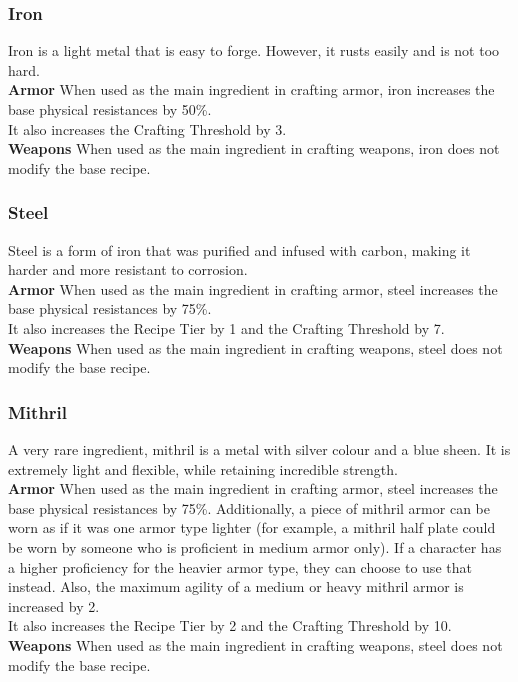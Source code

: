 \subsubsection{Iron}
Iron is a light metal that is easy to forge.
However, it rusts easily and is not too hard.\\
\textbf{Armor}
When used as the main ingredient in crafting armor, iron increases the base physical resistances by 50\%.\\
It also increases the Crafting Threshold by 3.\\
\textbf{Weapons}
When used as the main ingredient in crafting weapons, iron does not modify the base recipe.

\subsubsection{Steel}
Steel is a form of iron that was purified and infused with carbon, making it harder and more resistant to corrosion.\\
\textbf{Armor}
When used as the main ingredient in crafting armor, steel increases the base physical resistances by 75\%.\\
It also increases the Recipe Tier by 1 and the Crafting Threshold by 7.\\
\textbf{Weapons}
When used as the main ingredient in crafting weapons, steel does not modify the base recipe.\\

\subsubsection{Mithril}
A very rare ingredient, mithril is a metal with silver colour and a blue sheen.
It is extremely light and flexible, while retaining incredible strength.\\
\textbf{Armor}
When used as the main ingredient in crafting armor, steel increases the base physical resistances by 75\%.
Additionally, a piece of mithril armor can be worn as if it was one armor type lighter (for example, a mithril half plate could be worn by someone who is proficient in medium armor only).
If a character has a higher proficiency for the heavier armor type, they can choose to use that instead.
Also, the maximum agility of a medium or heavy mithril armor is increased by 2.\\
It also increases the Recipe Tier by 2 and the Crafting Threshold by 10.\\
\textbf{Weapons}
When used as the main ingredient in crafting weapons, steel does not modify the base recipe.